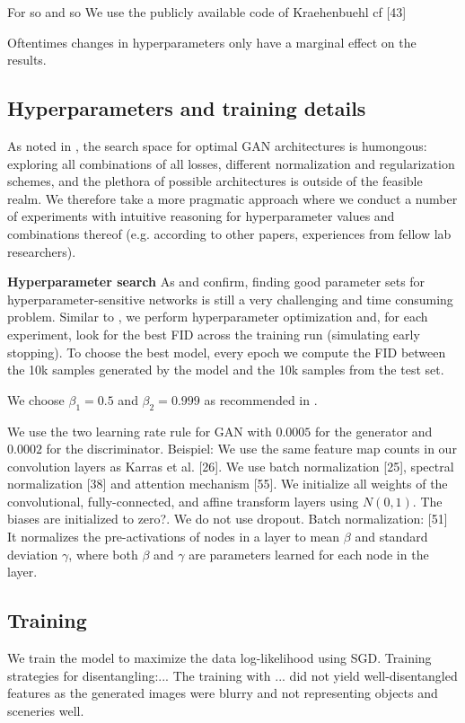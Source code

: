 \documentclass[12pt,a4paper]{article}
\begin{document}
\par For so and so We use the publicly available code of Kraehenbuehl cf [43]

\par Oftentimes changes in hyperparameters only have a marginal effect on the results.

\subsection{Hyperparameters and training details}
As noted in \cite{GANLandscape}, the search space for optimal GAN architectures is humongous: exploring all combinations of all losses, different normalization and regularization schemes, and the plethora of possible architectures is outside of the feasible realm. We therefore take a more pragmatic approach where we conduct a number of experiments with intuitive reasoning for hyperparameter values and combinations thereof (e.g. according to other papers, experiences from fellow lab researchers).

\textbf{Hyperparameter search} As \cite{SpatialBDecoder} and \cite{ChallCmonAssInUnLearOfDR} confirm, finding good parameter sets for hyperparameter-sensitive networks is still a very challenging and time consuming problem. Similar to \cite{AreGANsEqual}, we perform hyperparameter optimization and, for each experiment, look for the best FID across the training run (simulating early stopping). To choose the best model, every epoch we compute the FID between the 10k samples generated by the model and the 10k samples from the test set.

We choose $\beta_1 = 0.5$ and $\beta_2 = 0.999$ as recommended in \cite{GANLandscape}.

We use the two learning rate rule for GAN \cite{1706.08500} with $0.0005$ for the generator and $0.0002$ for the discriminator.
Beispiel: We use the same feature map counts in our convolution layers as Karras et al. [26]. We use batch normalization [25], spectral normalization [38] and attention mechanism [55].
We initialize all weights of the convolutional, fully-connected, and affine transform layers using $N(0, 1)$. The biases are initialized to zero?.
We do not use dropout.
Batch normalization: [51] It normalizes the pre-activations of nodes in a layer to mean $\beta$ and standard deviation $\gamma$, where both $\beta$ and $\gamma$ are parameters learned for each node in the layer.

\subsection{Training}
We train the model to maximize the data log-likelihood using SGD.
Training strategies for disentangling:...
The training with ... did not yield well-disentangled features as the generated images were blurry and not representing objects and sceneries well. 
\end{document}
